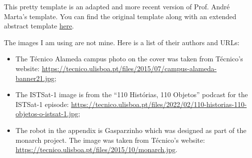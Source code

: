 This pretty template is an adapted and more recent version of Prof. André Marta's template. You can find the original template along with an extended abstract template \href{https://fenix.tecnico.ulisboa.pt/homepage/ist31052/documentos-para-elaboracao-da-tese}{here}.

The images I am using are not mine. Here is a list of their authors and URLs:

\begin{itemize}
    \item The Técnico Alameda campus photo on the cover was taken from Técnico's website: \url{https://tecnico.ulisboa.pt/files/2015/07/campus-alameda-banner21.jpg};
    \item The ISTSat-1 image is from the ``110 Histórias, 110 Objetos'' podcast for the ISTSat-1 episode: \url{https://tecnico.ulisboa.pt/files/2022/02/110-historias-110-objetos-o-istsat-1.jpg};
    \item The robot in the appendix is Gasparzinho which was designed as part of the \acrshort{monarch} project. The image was taken from Técnico's website: \url{https://tecnico.ulisboa.pt/files/2015/10/monarch.jpg}.
\end{itemize}


